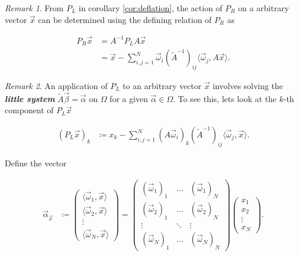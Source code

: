 \documentclass{article}
\theoremstyle{plain} %
\theoremstyle{convention} %
\theoremstyle{remark} %
\newtheorem*{remark}{Remark} %
\def\df#1{\textbf{\textit{#1}}}
\numberwithin{equation}{section}
\begin{document}
\begin{remark}
From $P_L$ in corollary \ref{cor:deflation}, the action of $P_R$ on a arbitrary vector $\vec{x}$ can be determined using the defining relation of $P_R$ as

\begin{align*}
    P_R\vec{x} &= A^{-1} P_L A \vec{x} \\ 
    &= \vec{x} - \sum_{i,j=1}^N \vec{\omega}_i (\widetilde{A}^{-1})_{ij} \langle \vec{\omega}_j, A \vec{x} \rangle.
\end{align*}
\end{remark}

\begin{remark}
An application of $P_L$ to an arbitrary vector $\vec{x}$ involves solving the \df{little system} $\widetilde{A} \vec{\beta} = \vec{\alpha}$ on $\Omega$ for a given $\vec{\alpha} \in \Omega$. To see this, lets look at the $k$-th component of $P_L \vec{x}$

\begin{align*}
    (P_L\vec{x})_k &\coloneqq x_k - \sum_{i,j=1}^N (A\vec{\omega}_i)_k (\widetilde{A}^{-1})_{ij} \langle \vec{\omega}_j, \vec{x} \rangle.
\end{align*}

Define the vector

\begin{align*}
    \vec{\alpha}_{\vec{x}} &\coloneqq
    \begin{pmatrix}
        \langle \vec{\omega}_1, \vec{x} \rangle \\
        \langle \vec{\omega}_2, \vec{x} \rangle \\
        \vdots \\
        \langle \vec{\omega}_N, \vec{x} \rangle
    \end{pmatrix} = \begin{pmatrix}
        (\vec{\omega}_1)_1 & \hdots & (\vec{\omega}_1)_N \\
        (\vec{\omega}_2)_1 & \hdots & (\vec{\omega}_2)_N \\
        \vdots & \ddots & \vdots \\
        (\vec{\omega}_N)_1 & \hdots & (\vec{\omega}_N)_N
    \end{pmatrix} \begin{pmatrix}
        x_1 \\
        x_2 \\
        \vdots \\
        x_N
    \end{pmatrix}.
\end{align*}


\end{remark}
\end{document}
